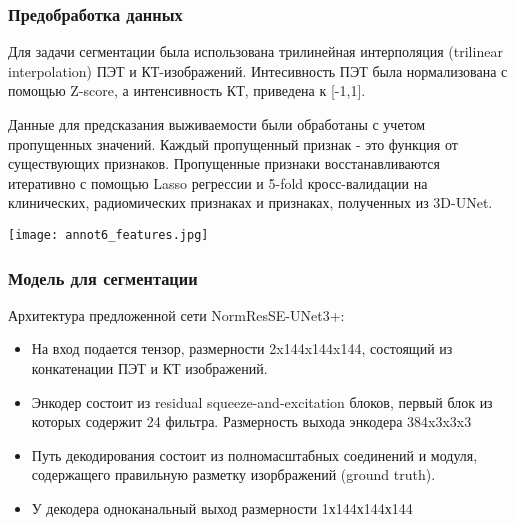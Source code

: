 \subsubsection*{Предобработка данных}
Для задачи сегментации была использована трилинейная интерполяция (trilinear interpolation) ПЭТ и КТ-изображений.
Интесивность ПЭТ была нормализована с помощью Z-score, а интенсивность КТ, 
приведена к [-1,1]. \par
Данные для предсказания выживаемости были обработаны с учетом пропущенных значений. Каждый пропущенный признак - 
это функция от существующих признаков. Пропущенные признаки восстанавливаются итеративно
с помощью Lasso регрессии и 5-fold кросс-валидации на клинических, радиомических признаках и признаках, полученных из 3D-UNet.


\begin{minipage}{1.0\linewidth}
    \begin{center}
    
    \texttt{[image: annot6\_features.jpg]} \\
\end{center}
\end{minipage}


\subsubsection*{Модель для сегментации}
Архитектура предложенной сети NormResSE-UNet3+: 
\begin{itemize}
    \item На вход подается тензор, размерности 2x144x144x144, состоящий из конкатенации
    ПЭТ и КТ изображений.
    \item Энкодер состоит из residual squeeze-and-excitation блоков, первый блок из которых 
    содержит 24 фильтра. Размерность выхода энкодера 384x3x3x3
    \item Путь декодирования состоит из полномасштабных соединений и модуля, содержащего 
    правильную разметку изорбражений (ground truth).
    \item У декодера одноканальный выход размерности 1х144х144х144
\end{itemize}



